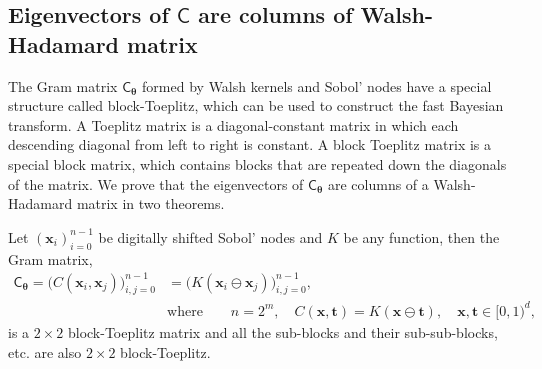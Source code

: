 \documentclass{svjour3}                     %
\newcommand{\bm}[1]{\boldsymbol{#1}}
\newcommand{\vtheta}{{\bm{\theta}}}
\newcommand{\vt}{\bm{t}}
\newcommand{\vx}{\bm{x}}
\newcommand{\mC}{\mathsf{C}}
\newcommand{\mCtheta}{{\mathsf{C}_{\vtheta}}}
\begin{document}
\subsection{Eigenvectors of $\mC$ are columns of Walsh-Hadamard matrix}
\label{sec:eigenvector_hadamard}
The Gram matrix $\mCtheta$ formed by Walsh kernels and Sobol' nodes have a special structure called  block-Toeplitz, which can be used to construct the fast Bayesian transform. 
A Toeplitz matrix is a diagonal-constant matrix in which each descending diagonal from left to right is constant. A block Toeplitz matrix is a special block matrix, which contains blocks that are repeated down the diagonals of the matrix.
We prove that the eigenvectors of $\mCtheta$ are columns of a Walsh-Hadamard matrix in two theorems. 

\begin{theorem}
	\label{thrm:block-toeplitz}
	Let $\left(\vx_i\right)_{i=0}^{n-1}$ be digitally shifted Sobol' nodes and $K$ be any function,
	then the Gram matrix,
	\begin{align*}
	\mCtheta = \bigl(C(\vx_i, \vx_j)\bigr)_{i,j=0}^{n-1} &= \bigl(K(\vx_i \ominus \vx_j)\bigr)_{i,j=0}^{n-1},   \\ & \text{where} \quad \quad n=2^m, \quad C(\vx, \vt) = K(\vx \ominus \vt), \quad  \vx, \vt \in [0,1)^d, \qquad
	\end{align*}
	is a $2\times 2$ block-Toeplitz matrix and all the sub-blocks and their sub-sub-blocks, etc. are also $2\times 2$ block-Toeplitz. 
\end{theorem}
\end{document}

